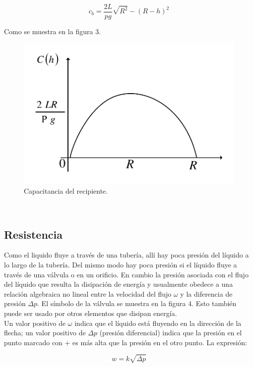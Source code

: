 \documentclass[a4paper,12pt,twoside]{proyectotanquesecci}
\begin{document}
\begin{equation}
c_{b}=\frac{2L}{pg}\sqrt{R^{2}}-(R-h)^{2}
\label{Ecu 4}
\end{equation}

Como se muestra en la figura 3.

\begin{figure}[h]
\centering
\includegraphics[scale=0.5]{Figura3}
\renewcommand{\figurename}{Fig.}
\caption{Capacitancia del recipiente.}
\label{Capacitancia del recipiente.}
\end{figure}

\subsection{Resistencia}

Como el liquido fluye a través de una tubería, allí hay poca presión del líquido a lo largo de la tubería. Del mismo modo hay poca presión si el líquido fluye a través de una válvula o en un orificio. En cambio la presión asociada con el flujo del líquido que resulta la disipación de energía y usualmente obedece a una relación algebraica no lineal entre la velocidad del flujo $\omega$ y la diferencia de presión $\Delta p$. El símbolo de la válvula se muestra en la figura 4. Esto también puede ser usado por otros elementos que disipan energía. \\

Un valor positivo de $\omega$ indica que el líquido está fluyendo en la dirección de la flecha; un valor positivo de $\Delta p$ (presión diferencial) indica que la presión en el punto marcado con $+$ es más alta que la presión en el otro punto. La expresión:

\begin{equation}
w=k\sqrt{\Delta p}
\label{Ecu 7}
\end{equation}
\end{document}

